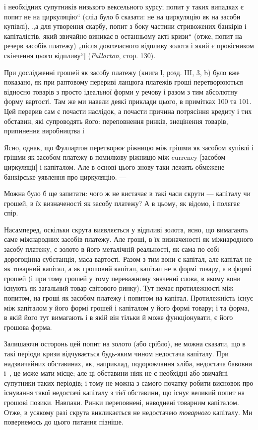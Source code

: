 \parcont{}  %
і необхідних супутників низького вексельного курсу; попит у таких
випадках є попит не на циркуляцію“ (слід було б сказати:
не на циркуляцію як на засоби купівлі), „а для утворення скарбу,
попит з боку частини стривожених банкірів і капіталістів, який
звичайно виникає в останньому акті кризи“ (отже, попит на резерв
засобів платежу) „після довгочасного відпливу золота і який є
провісником скінчення цього відпливу“] (\emph{Fullarton}, стор. 130).

При дослідженні грошей як засобу платежу (книга І, розд. III,
3, b) було вже показано, як при раптовому перериві ланцюга платежів
гроші перетворюються відносно товарів з просто ідеальної
форми у речову і разом з тим абсолютну форму вартості.
Там же ми навели деякі приклади цього, в примітках 100 та 101.
Цей перерив сам є почасти наслідок, а почасти причина потрясіння
кредиту і тих обставин, які супроводять його: переповнення
ринків, знецінення товарів, припинення виробництва і~

Ясно, однак, що Фуллартон перетворює ріжницю між грішми як
засобом купівлі і грішми як засобом платежу в помилкову ріжницю
між currency [засобом циркуляції] і капіталом. Але в основі
цього знову таки лежить обмежене банкірське уявлення про
циркуляцію. —

Можна було б ще запитати: чого ж не вистачає в такі часи
скрути — капіталу чи грошей, в їх визначеності як засобу платежу?
А в цьому, як відомо, і полягає спір.

Насамперед, оскільки скрута виявляється у відпливі золота,
ясно, що вимагають саме міжнародних засобів платежу. Але
гроші, в їх визначеності як міжнародного засобу платежу, є
золото в його металічній реальності, як сама по собі дорогоцінна
субстанція, маса вартості. Разом з тим вони є капітал, але капітал
не як товарний капітал, а як грошовий капітал, капітал не
в формі товару, а в формі грошей (і при тому грошей у тому
переважному значенні слова, в якому вони існують як загальний
товар світового ринку). Тут немає протилежності між попитом,
на гроші як засобом платежу і попитом на капітал. Протилежність
існує між капіталом у його формі грошей і капіталом у
його формі товару; і та форма, в якій його тут вимагають і в
якій він тільки й може функціонувати, є його грошова форма.

Залишаючи осторонь цей попит на золото (або срібло), не
можна сказати, що в такі періоди кризи відчувається будь-яким
чином недостача капіталу. При надзвичайних обставинах, як,
наприклад, подорожчання хліба, недостача бавовни і~, це
може мати місце; але ці обставини ніяк не є необхідні або звичайні
супутники таких періодів; і тому не можна з самого початку
робити висновок про існування такої недостачі капіталу
з тієї обставини, що існує великий попит на грошові позики.
Навпаки. Ринки переповнені, наводнені товарним капіталом.
Отже, в усякому разі скрута викликається не недостачею \emph{товарного}
капіталу. Ми повернемось до цього питання пізніше.
\parbreak{}  %
